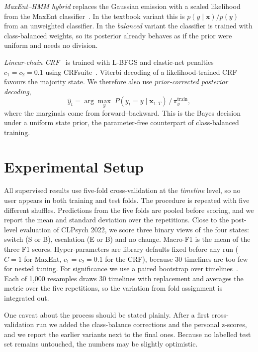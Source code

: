 \documentclass[runningheads]{llncs}
\newcommand{\state}[1]{\textsc{#1}}
\begin{document}
\emph{MaxEnt--HMM hybrid} replaces the Gaussian emission with a scaled likelihood from the MaxEnt classifier~\cite{bourlard1994connectionist}. In the textbook variant this is $p(y \mid \mathbf{x}) / p(y)$ from an unweighted classifier. In the \emph{balanced} variant the classifier is trained with class-balanced weights, so its posterior already behaves as if the prior were uniform and needs no division.

\emph{Linear-chain CRF}~\cite{lafferty2001conditional} is trained with L-BFGS and elastic-net penalties $c_1 = c_2 = 0.1$ using CRFsuite~\cite{okazaki2007crfsuite}. Viterbi decoding of a likelihood-trained CRF favours the majority state. We therefore also use \emph{prior-corrected posterior decoding},
\begin{equation}
\hat{y}_t = \arg\max_{y} \; P(y_t = y \mid \mathbf{x}_{1:T}) \,/\, \pi^{\text{train}}_y,
\end{equation}
where the marginals come from forward--backward. This is the Bayes decision under a uniform state prior, the parameter-free counterpart of class-balanced training.

\section{Experimental Setup}

All supervised results use five-fold cross-validation at the \emph{timeline} level, so no user appears in both training and test folds. The procedure is repeated with five different shuffles. Predictions from the five folds are pooled before scoring, and we report the mean and standard deviation over the repetitions. Close to the post-level evaluation of CLPsych 2022, we score three binary views of the four states: switch (\state{S} or \state{B}), escalation (\state{E} or \state{B}) and no change. Macro-F1 is the mean of the three F1 scores. Hyper-parameters are library defaults fixed before any run ($C = 1$ for MaxEnt, $c_1 = c_2 = 0.1$ for the CRF), because 30 timelines are too few for nested tuning. For significance we use a paired bootstrap over timelines~\cite{efron1993introduction,bergkirkpatrick2012empirical}. Each of 1,000 resamples draws 30 timelines with replacement and averages the metric over the five repetitions, so the variation from fold assignment is integrated out.

One caveat about the process should be stated plainly. After a first cross-validation run we added the class-balance corrections and the personal z-scores, and we report the earlier variants next to the final ones. Because no labelled test set remains untouched, the numbers may be slightly optimistic.
\end{document}
